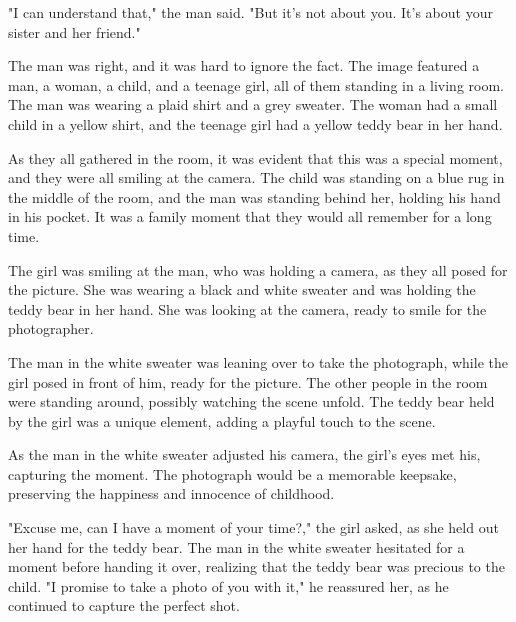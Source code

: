 \documentclass[smalldemyvopaper,11pt,twoside,onecolumn,openright,extrafontsizes]{memoir}
\begin{document}
"I can understand that," the man said. "But it's not about you. It's about your sister and her friend."\par
The man was right, and it was hard to ignore the fact. The image featured a man, a woman, a child, and a teenage girl, all of them standing in a living room. The man was wearing a plaid shirt and a grey sweater. The woman had a small child in a yellow shirt, and the teenage girl had a yellow teddy bear in her hand.\par
As they all gathered in the room, it was evident that this was a special moment, and they were all smiling at the camera. The child was standing on a blue rug in the middle of the room, and the man was standing behind her, holding his hand in his pocket. It was a family moment that they would all remember for a long time.\par
The girl was smiling at the man, who was holding a camera, as they all posed for the picture. She was wearing a black and white sweater and was holding the teddy bear in her hand. She was looking at the camera, ready to smile for the photographer.\par
The man in the white sweater was leaning over to take the photograph, while the girl posed in front of him, ready for the picture. The other people in the room were standing around, possibly watching the scene unfold. The teddy bear held by the girl was a unique element, adding a playful touch to the scene.\par
As the man in the white sweater adjusted his camera, the girl's eyes met his, capturing the moment. The photograph would be a memorable keepsake, preserving the happiness and innocence of childhood.\par
"Excuse me, can I have a moment of your time?," the girl asked, as she held out her hand for the teddy bear. The man in the white sweater hesitated for a moment before handing it over, realizing that the teddy bear was precious to the child. "I promise to take a photo of you with it," he reassured her, as he continued to capture the perfect shot.\par
\end{document}
